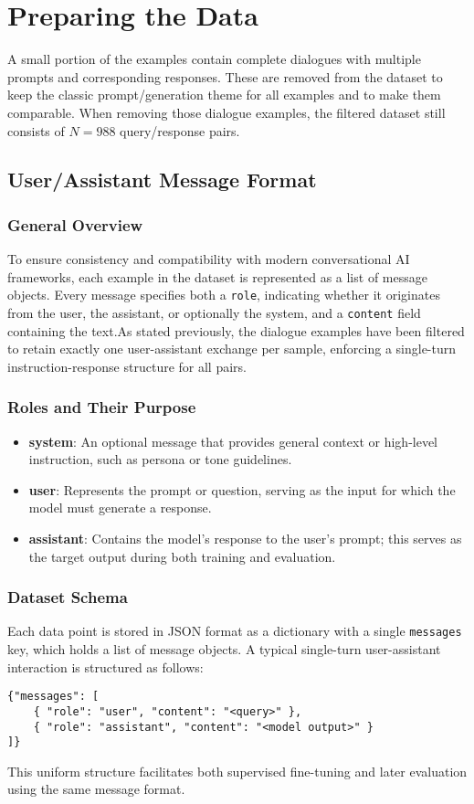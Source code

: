 \section{Preparing the Data}
A small portion of the examples contain complete dialogues with multiple prompts and corresponding responses. These are removed from the dataset to keep the classic prompt/generation theme for all examples and to make them comparable. When removing those dialogue examples, the filtered dataset still consists of $N = 988$ query/response pairs.

\subsection{User/Assistant Message Format}\label{subsec:message_format}

\subsubsection{General Overview}
To ensure consistency and compatibility with modern conversational AI frameworks, each example in the dataset is represented as a list of message objects. Every message specifies both a \texttt{role}, indicating whether it originates from the user, the assistant, or optionally the system, and a \texttt{content} field containing the text.As stated previously, the dialogue examples have been filtered to retain exactly one user-assistant exchange per sample, enforcing a single-turn instruction-response structure for all pairs.

\subsubsection{Roles and Their Purpose}
\begin{itemize}
\item \textbf{system}: An optional message that provides general context or high-level instruction, such as persona or tone guidelines.
\item \textbf{user}: Represents the prompt or question, serving as the input for which the model must generate a response.
\item \textbf{assistant}: Contains the model's response to the user's prompt; this serves as the target output during both training and evaluation.
\end{itemize}

\subsubsection{Dataset Schema}
Each data point is stored in JSON format as a dictionary with a single \texttt{messages} key, which holds a list of message objects. A typical single-turn user-assistant interaction is structured as follows:
\begin{lstlisting}[caption={User–assistant message pair}]
{"messages": [
    { "role": "user", "content": "<query>" },
    { "role": "assistant", "content": "<model output>" }
]}
\end{lstlisting}
This uniform structure facilitates both supervised fine-tuning and later evaluation using the same message format.

